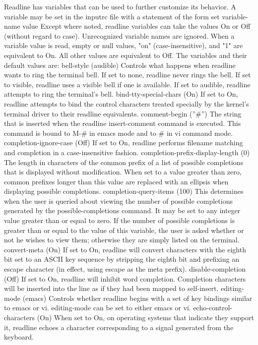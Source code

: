 \documentclass[11pt]{article}
\begin{document}
{{{Readline has variables that can be used to further customize its behavior. A variable may be set in the inputrc file with a statement of the form
set variable-name value
Except where noted, readline variables can take the values On or Off (without regard to case). Unrecognized variable names are ignored. When a variable value is read, empty or null values, "on" (case-insensitive), and "1" are equivalent to On. All other values are equivalent to Off. The variables and their default values are:
bell-style (audible)
Controls what happens when readline wants to ring the terminal bell. If set to none, readline never rings the bell. If set to visible, readline uses a visible bell if one is available. If set to audible, readline attempts to ring the terminal's bell.
bind-tty-special-chars (On)
If set to On, readline attempts to bind the control characters treated specially by the kernel's terminal driver to their readline equivalents.
comment-begin (''#'')
The string that is inserted when the readline insert-comment command is executed. This command is bound to M-# in emacs mode and to # in vi command mode.
completion-ignore-case (Off)
If set to On, readline performs filename matching and completion in a case-insensitive fashion.
completion-prefix-display-length (0)
The length in characters of the common prefix of a list of possible completions that is displayed without modification. When set to a value greater than zero, common prefixes longer than this value are replaced with an ellipsis when displaying possible completions.
completion-query-items (100)
This determines when the user is queried about viewing the number of possible completions generated by the possible-completions command. It may be set to any integer value greater than or equal to zero. If the number of possible completions is greater than or equal to the value of this variable, the user is asked whether or not he wishes to view them; otherwise they are simply listed on the terminal.
convert-meta (On)
If set to On, readline will convert characters with the eighth bit set to an ASCII key sequence by stripping the eighth bit and prefixing an escape character (in effect, using escape as the meta prefix).
disable-completion (Off)
If set to On, readline will inhibit word completion. Completion characters will be inserted into the line as if they had been mapped to self-insert.
editing-mode (emacs)
Controls whether readline begins with a set of key bindings similar to emacs or vi. editing-mode can be set to either emacs or vi.
echo-control-characters (On)
When set to On, on operating systems that indicate they support it, readline echoes a character corresponding to a signal generated from the keyboard.
}}}
\end{document}
